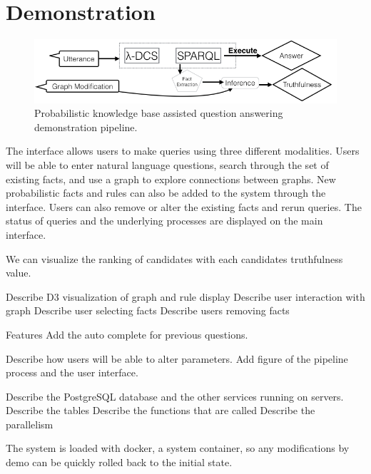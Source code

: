 
\section{Demonstration}

\begin{figure}
\centering
 \includegraphics[width=0.9\linewidth]{images/probqa-pipeline.png}
 \caption{Probabilistic knowledge base assisted question answering demonstration pipeline.}
\label{fig:probqa-pipeline}
\end{figure}

The interface allows users to make queries using three different modalities.
Users will be able to enter natural language questions, search through the set of existing facts, and use a graph to explore connections between graphs.
New probabilistic facts and rules can also be added to the system through the interface.
Users can also remove or alter the existing facts and rerun queries.
The status of queries and the underlying processes are displayed on the main interface.


We can visualize the ranking of candidates with each candidates truthfulness value.

Describe D3 visualization of graph and rule display
Describe user interaction with graph
Describe user selecting facts
Describe users removing facts


Features
  Add the auto complete for previous questions.

Describe how users will be able to alter parameters.
Add figure of the pipeline process and the user interface.


Describe the PostgreSQL database and the other services running on servers.
Describe the tables 
Describe the functions that are called
Describe the parallelism

The system is loaded with docker, a system container, so any modifications by demo can be quickly rolled back to the initial state.





